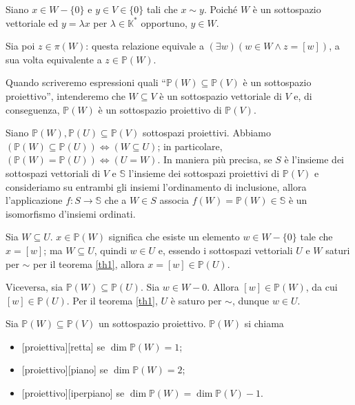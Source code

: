 \Proof Siano $x \in W - \lbrace 0 \rbrace$ e $y \in V \in \lbrace 0 \rbrace$ tali che $x \sim y$. Poich\'e $W$ \`e un sottospazio vettoriale ed $y = \lambda x$ per $\lambda \in \mathbb{K}^*$ opportuno, $y \in W$.
	\par Sia poi $z \in \pi(W)$: questa relazione equivale a $(\exists w)(w \in W \land z = [w])$, a sua volta equivalente a $z \in \mathbb{P}(W)$. \EndProof
	\par Quando scriveremo espressioni quali ``$\mathbb{P}(W) \subseteq \mathbb{P}(V)$ \`e un sottospazio proiettivo'', intenderemo che $W \subseteq V$ \`e un sottospazio vettoriale di $V$ e, di conseguenza, $\mathbb{P}(W)$ \`e un sottospazio proiettivo di $\mathbb{P}(V)$.
\begin{Corollary}\label{cor0.1}
	Siano $\mathbb{P}(W), \mathbb{P}(U) \subseteq \mathbb{P}(V)$ sottospazi proiettivi. Abbiamo $(\mathbb{P}(W) \subseteq \mathbb{P}(U)) \Leftrightarrow (W \subseteq U)$; in particolare, $(\mathbb{P}(W) = \mathbb{P}(U)) \Leftrightarrow (U = W)$. In maniera pi\`u precisa, se $S$ \`e l'insieme dei sottospazi vettoriali di $V$ e $\mathbb{S}$ l'insieme dei sottospazi proiettivi di $\mathbb{P}(V)$ e consideriamo su entrambi gli insiemi l'ordinamento di inclusione, allora l'applicazione $f: S \rightarrow \mathbb{S}$ che a $W \in S$ associa $f(W) = \mathbb{P}(W) \in \mathbb{S}$ \`e un isomorfismo d'insiemi ordinati.
\end{Corollary}
\Proof Sia $W \subseteq U$. $x \in \mathbb{P}(W)$ significa che esiste un elemento $w \in W - \lbrace 0 \rbrace$ tale che $x = [w]$; ma $W \subseteq U$, quindi $w \in U$ e, essendo i sottospazi vettoriali $U$ e $W$ saturi per $\sim$ per il teorema \ref{th1}, allora $x = [w] \in \mathbb{P}(U)$.
	\par Viceversa, sia $\mathbb{P}(W) \subseteq \mathbb{P}(U)$. Sia $w \in W - 0$. Allora $[w] \in \mathbb{P}(W)$, da cui $[w] \in \mathbb{P}(U)$. Per il teorema \ref{th1}, $U$ \`e saturo per $\sim$, dunque $w \in U$. \EndProof
\begin{Definition}\label{def4}
	Sia $\mathbb{P}(W) \subseteq \mathbb{P}(V)$ un sottospazio proiettivo. $\mathbb{P}(W)$ si chiama
	\begin{itemize}
		\item{}[proiettiva][retta] se $\dim \mathbb{P}(W) = 1$;
		\item{}[proiettivo][piano] se $\dim \mathbb{P}(W) = 2$;
		\item{}[proiettivo][iperpiano] se $\dim \mathbb{P}(W) = \dim \mathbb{P}(V) - 1$.
	\end{itemize}
\end{Definition}
